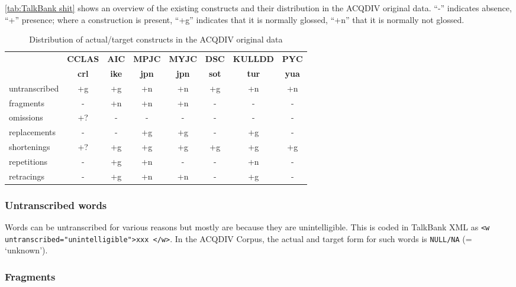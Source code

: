 \documentclass[a4paper, 11pt]{book}
\begin{document}
\autoref{tab:TalkBank shit} shows an overview of the existing constructs and their distribution in the ACQDIV original data. “-” indicates absence, “+” presence; where a construction is present, “+g” indicates that it is normally glossed, “+n” that it is normally not glossed.

\begin{table}
	\centering
	\begin{tabular}{lccccccc}
		\toprule
		& \textbf{CCLAS} & \textbf{AIC} & \textbf{MPJC} & \textbf{MYJC} & \textbf{DSC} & \textbf{KULLDD} & \textbf{PYC} \\
								  & \textbf{crl} & \textbf{ike} & \textbf{jpn} & \textbf{jpn} & \textbf{sot} & \textbf{tur} & \textbf{yua} \\
		\midrule
				   untranscribed 	& +g 		& +g 			& +n 			& +n 			& +g 			& +n 			& +n \\
				   fragments		& - 		& +n 			& +n 			& +n 			& - 			& - 			& - \\
				   omissions		& +? 		& - 			& - 			& - 			& - 			& - 			& - \\
				   replacements 	& - 		& - 			& +g 			& +g 			& - 			& +g 			& - \\
				   shortenings 		& +?		& +g 			& +g 			& +g 	 		& +g			& +g 			& +g \\
				   repetitions 		& - 		& +g 			& +n 			& - 			& - 			& +n 			& - \\
				   retracings 		& - 		& +g 			& +n 			& +n 			& - 			& +g 			& - \\
		\bottomrule
	\end{tabular}
	\caption{Distribution of actual/target constructs in the ACQDIV original data}
	\label{tab:TalkBank shit}
\end{table}

\subsubsection*{Untranscribed words}

Words can be untranscribed for various reasons but mostly are because they are unintelligible. This is coded in TalkBank XML as \texttt{<w untranscribed="unintelligible">xxx </w>}. In the ACQDIV Corpus, the actual and target form for such words is \texttt{NULL/NA} (= ‘unknown’).

\subsubsection*{Fragments}
\end{document}
